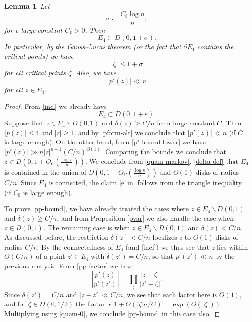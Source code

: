 \documentclass[12pt]{amsart}
\newtheorem{lemma}{Lemma}[section]
\newcommand{\eps}{\varepsilon}
\begin{document}
\begin{lemma}\label{initial-apps} Let
\begin{equation}\label{sigma-def}
    \sigma \coloneqq \frac{C_0 \log n}{n},
\end{equation}
for a large constant $C_0>0$.  Then
\begin{equation}\label{e1in}
  E_4 \subset D(0, 1 + \sigma).
\end{equation}
In particular, by the Gauss--Lucas theorem (or the fact that $\partial E_1$ contains the critical points) we have
\begin{equation}\label{crit-bound-2}
    |\zeta| \leq 1 + \sigma
\end{equation}
for all critical points $\zeta$.  Also, we have
\begin{equation}\label{pp-bound}
    |p'(z)| \ll n
\end{equation}
for all $z \in E_4$.
\end{lemma}

\begin{proof}  From \eqref{incl} we already have
$$  E_4 \subset D(0, 1 + \eps).$$
Suppose that $z \in E_4 \backslash D(0,1)$ and $\delta(z) \geq C/n$ for a large constant $C$.  Then $|p(z)| \leq 4$ and $|z| \geq 1$, and by \eqref{pform-alt} we conclude that $|p'(z)| \ll n$ (if $C$ is large enough).  On the other hand, from \eqref{p'-bound-lower} we have $|p'(z)| \gg n |z|^{n-1} (C/n)^{O(1)}$.  Comparing the bounds we conclude that
$z \in D\left(0, 1 + O_C\left(\frac{\log n}{n} \right)\right)$.  We conclude from \eqref{quam-markov}, \eqref{delta-def} that $E_4$ is contained in the union of $D\left(0, 1 + O_C\left(\frac{\log n}{n} \right)\right)$ and $O(1)$ disks of radius $C/n$.  Since $E_4$ is connected, the claim \eqref{e1in} follows from the triangle inequality (if $C_0$ is large enough).

To prove \eqref{pp-bound}, we have already treated the cases where $z \in E_4 \backslash D(0,1)$ and $\delta(z) \geq C/n$, and from Proposition \ref{pvar} we also handle the case when $z \in D(0,1)$.  The remaining case is when $z \in E_4 \backslash D(0,1)$ and $\delta(z) < C/n$.  As discussed before, the restriction $\delta(z) < C/n$ localizes $z$ to $O(1)$ disks of radius $C/n$.  By the connectedness of $E_4$ (and \eqref{incl}) we thus see that $z$ lies within $O(C/n)$ of a point $z' \in E_4$ with $\delta(z') = C/n$, so that $p'(z') \ll n$ by the previous analysis.  From \eqref{pp-factor} we have
$$ \left|\frac{p'(z)}{p'(z')}\right| = \prod_\zeta \frac{|z-\zeta|}{|z'-\zeta|}.$$
Since $\delta(z') = C/n$ and $|z-z'| \ll C/n$, we see that each factor here is $O(1)$, and for $\zeta \in D(0,1/2)$ the factor is $1 + O(|\zeta| n / C) = \exp(O(|\zeta|))$.  Multiplying using \eqref{quam-0}, we conclude \eqref{pp-bound} in this case also.
\end{proof}
\end{document}
